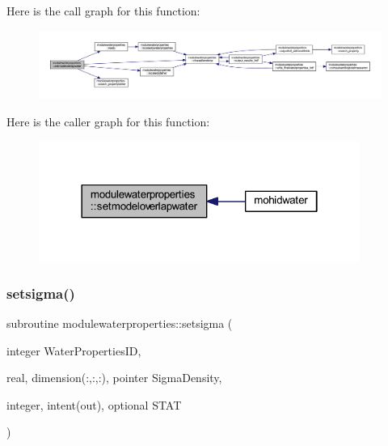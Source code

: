 Here is the call graph for this function\+:\nopagebreak
\begin{figure}[H]
\begin{center}
\leavevmode
\includegraphics[width=350pt]{namespacemodulewaterproperties_a485e6f75e05fccffb1b2eba1fc8c0226_cgraph}
\end{center}
\end{figure}
Here is the caller graph for this function\+:\nopagebreak
\begin{figure}[H]
\begin{center}
\leavevmode
\includegraphics[width=298pt]{namespacemodulewaterproperties_a485e6f75e05fccffb1b2eba1fc8c0226_icgraph}
\end{center}
\end{figure}
\mbox{\label{namespacemodulewaterproperties_a84c625b22d0fa0200b0f18fc38efb8e7}} 
\subsubsection{\texorpdfstring{setsigma()}{setsigma()}}
{\footnotesize\ttfamily subroutine modulewaterproperties\+::setsigma (\begin{DoxyParamCaption}\item[{integer}]{Water\+Properties\+ID,  }\item[{real, dimension(\+:,\+:,\+:), pointer}]{Sigma\+Density,  }\item[{integer, intent(out), optional}]{S\+T\+AT }\end{DoxyParamCaption})\hspace{0.3cm}{\ttfamily [private]}}

